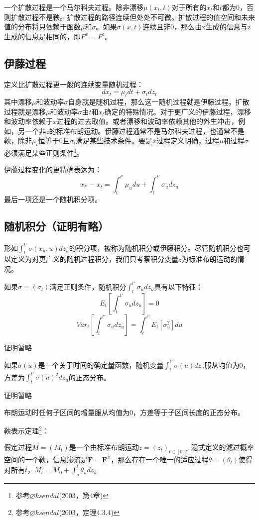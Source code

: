 \documentclass[UTF8]{ctexart}
\newcommand \qd[1] {\begin{qds} {#1} \end{qds}}
\begin{document}
一个扩散过程是一个马尔科夫过程。除非漂移$\mu(x_t,t)$对于所有的$x_t$和$t$都为0，否则扩散过程不是鞅。扩散过程的路径连续但处处不可微。扩散过程的值空间和未来值的分布将只依赖于函数$\mu$和$\sigma$。如果$\sigma(x,t)$连续且非0，那么由x生成的信息与z生成的信息是相同的，即$F^x=F^z$。

\subsection{伊藤过程}

定义比扩散过程更一般的连续变量随机过程：
$$dx_t=\mu_t dt+\sigma_tdz_t$$
其中漂移$\mu$和波动率$\sigma$自身就是随机过程，那么这一随机过程就是伊藤过程。扩散过程就是漂移$\mu$和波动率$\sigma$由$t$和$x_t$确定的特殊情况。对于更广义的伊藤过程，漂移和波动率依赖于$x$过程的过去取值。或者漂移和波动率依赖其他的外生冲击，例如，另一个非$z$的标准布朗运动。伊藤过程通常不是马尔科夫过程，也通常不是鞅，除非$\mu_t$恒等于0且$\sigma_t$满足某些技术条件。要是$x$过程定义明确，过程$\mu$和过程$\sigma$必须满足某些正则条件\footnote{参考$\varnothing ksendal$(2003，第4章)}。

伊藤过程变化的更精确表达为：
$$x_{t'}-x_t=\int_t^{t'}\mu_u du +\int_t^{t'} \sigma_u dz_u$$
最后一项还是一个随机积分项。

\subsection{随机积分（证明有略）}

形如$\int_t^{t'} \sigma(x_u,u)dz_u$的积分项，被称为随机积分或伊藤积分。尽管随机积分也可以定义为对更广义的随机过程积分，我们只考察积分变量$z$为标准布朗运动的情况。

如果$\sigma=(\sigma_t)$满足正则条件，随机积分$\int_t^{t'}\sigma_u dz_u$具有以下特征：
$$E_t[\int_t^{t'}\sigma_u dz_u]=0$$
$$Var_t[\int_t^{t'}\sigma_u dz_u]=\int_t^{t'}E_t[\sigma_u^2]du$$
\qd{证明暂略}

如果$\sigma(u)$是一个关于时间的确定量函数，随机变量$\int_t^{t'}\sigma(u) dz_u$服从均值为0，方差为$\int_t^{t'}\sigma(u)^2 dz_u$的正态分布。
\qd{证明暂略}

布朗运动时任何子区间的增量服从均值为0，方差等于子区间长度的正态分布。

\qd{鞅表示定理\footnote{参考$\varnothing ksendal$(2003，定理4.3.4)}：}假定过程$M=(M_t)$是一个由标准布朗运动$z=(z_t)_{t \in [0,T]}$隐式定义的滤过概率空间的一个鞅，信息渗流是$\textbf{F}=\textbf{F}^Z$，那么存在一个唯一的适应过程$\theta=(\theta_t)$使得对所有$t$，$M_t=M_0+\int_o^t \theta_u dz_u$
\end{document}
